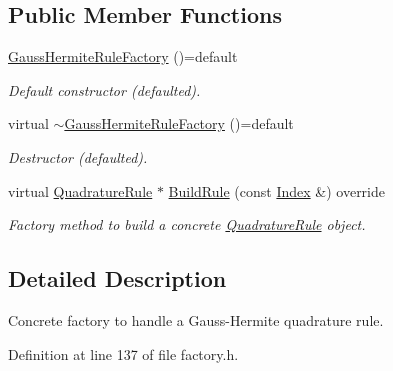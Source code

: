 \subsection*{Public Member Functions}
\begin{DoxyCompactItemize}
\item 
\hypertarget{classGaussHermiteRuleFactory_a192b5732878d8393276226a4f359f1cd}{\hyperlink{classGaussHermiteRuleFactory_a192b5732878d8393276226a4f359f1cd}{Gauss\-Hermite\-Rule\-Factory} ()=default}\label{classGaussHermiteRuleFactory_a192b5732878d8393276226a4f359f1cd}

\begin{DoxyCompactList}\small\item\em Default constructor (defaulted). \end{DoxyCompactList}\item 
\hypertarget{classGaussHermiteRuleFactory_ae01722716cbf1c2d540f8d8079208b92}{virtual \hyperlink{classGaussHermiteRuleFactory_ae01722716cbf1c2d540f8d8079208b92}{$\sim$\-Gauss\-Hermite\-Rule\-Factory} ()=default}\label{classGaussHermiteRuleFactory_ae01722716cbf1c2d540f8d8079208b92}

\begin{DoxyCompactList}\small\item\em Destructor (defaulted). \end{DoxyCompactList}\item 
virtual \hyperlink{classQuadratureRule}{Quadrature\-Rule} $\ast$ \hyperlink{classGaussHermiteRuleFactory_a1e907a5209041516fa18c86c79fb1ec6}{Build\-Rule} (const \hyperlink{typedefs_8h_a2c726f8f32697958e9d6c2afecda531d}{Index} \&) override
\begin{DoxyCompactList}\small\item\em Factory method to build a concrete \hyperlink{classQuadratureRule}{Quadrature\-Rule} object. \end{DoxyCompactList}\end{DoxyCompactItemize}


\subsection{Detailed Description}
Concrete factory to handle a Gauss-\/\-Hermite quadrature rule. 

Definition at line 137 of file factory.\-h.



